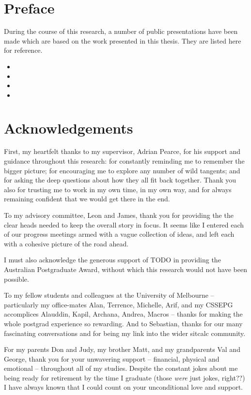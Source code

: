 \chapter*{Preface}
During the course of this research, a number of public presentations have been
 made which are based on the work presented in this thesis. They are listed
 here for reference.

\nobibliography*
\begin{itemize}
\item {}
\item {}
\item {}
\item {}
\end{itemize}


\chapter*{Acknowledgements} 

First, my heartfelt thanks to my supervisor, Adrian Pearce, for his support
and guidance throughout this research: for constantly reminding me to remember
the bigger picture; for encouraging me to explore any number of wild tangents; 
and for asking the deep questions about how they all fit back together.
Thank you also for trusting me to work in my own time, in my own way, and for
always remaining confident that we would get there in the end.

To my advisory committee, Leon and James, thank you for providing the the
clear heads needed to keep the overall story in focus.  It seems like I
entered each of our progress meetings armed with a vague collection of ideas,
 and left each with a cohesive picture of the road ahead.

I must also acknowledge the generous support of TODO in providing the
Australian Postgraduate Award, without which this research would not have
been possible.

To my fellow students and colleagues at the University of Melbourne -- particularly my office-mates Alan, Terrence, Michelle, Arif, and my CSSEPG accomplices Alauddin, Kapil, Archana, Andrea, Macros -- thanks for making the whole postgrad
experience so rewarding.  And to Sebastian, thanks for our many fascinating
conversations and for being my link into the wider sitcalc community.

For my parents Don and Judy, my brother Matt, and my grandparents Val and
George, thank you for your unwavering support -- financial, physical and emotional -- throughout all of my studies.  Despite the constant jokes about me being ready
for retirement by the time I graduate (those \emph{were} just jokes, right??) I
have always known that I could count on your unconditional love and support.

